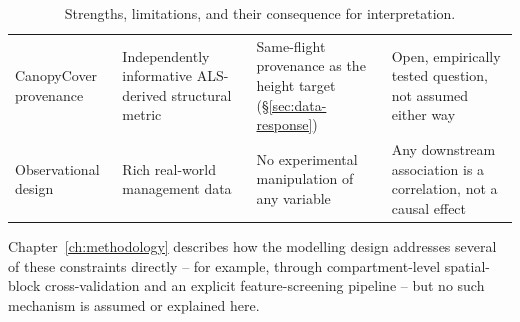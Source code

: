 \begin{table}[!htbp]
\begin{tabular}{p{2.4cm}p{4.0cm}p{4.0cm}p{4.4cm}}
CanopyCover provenance & Independently informative ALS-derived structural metric & Same-flight provenance as the height target (\S\ref{sec:data-response}) & Open, empirically tested question, not assumed either way \\
Observational design & Rich real-world management data & No experimental manipulation of any variable & Any downstream association is a correlation, not a causal effect \\
\hline
\end{tabular}
\caption{Strengths, limitations, and their consequence for interpretation.}
\label{tab:data-strengths-limitations}
\end{table}

Chapter~\ref{ch:methodology} describes how the modelling design addresses several of these
constraints directly -- for example, through compartment-level spatial-block cross-validation and
an explicit feature-screening pipeline -- but no such mechanism is assumed or explained here.
